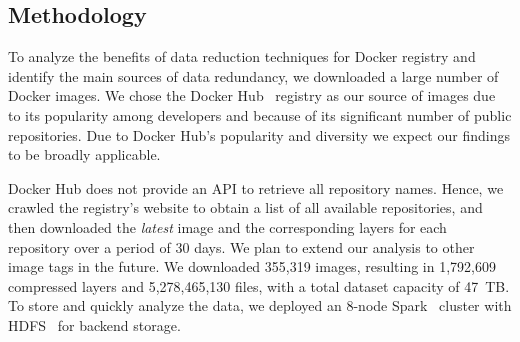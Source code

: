 \subsection{Methodology}
\label{sec:methodology}

%

To analyze the benefits of data reduction techniques for Docker registry and
identify the main sources of data redundancy, we downloaded a large number of
Docker images.
%
We chose the Docker Hub~\cite{docker-hub} registry as our source of images
due to its popularity among developers and because of its significant number
of public repositories.
%
Due to Docker Hub's popularity and diversity we expect our findings to be
broadly applicable.

Docker Hub does not provide an API to retrieve all repository names.
Hence, we crawled the registry's website to obtain a list of all available
repositories, and then downloaded the \emph{latest} image and the corresponding
layers for each repository over a period of 30 days.
%
We plan to extend our analysis to other image tags in the future.
%
We downloaded 355,319 images, resulting in 1,792,609 compressed layers
and 5,278,465,130 files, with a total dataset capacity of 47~TB.
%
%
To store and quickly analyze the data, we deployed an 8-node Spark~\cite{spark}
cluster with HDFS~\cite{hdfs} for backend storage.

